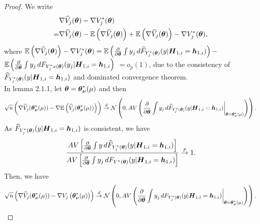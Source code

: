 \begin{proof}
	We write
	\begin{gather}
	\begin{flalign*}
	& \nabla \widehat{V}_j(\boldsymbol{\theta})  - \nabla V_j^*(\boldsymbol{\theta}) \\
	= & \nabla \widehat{V}_j(\boldsymbol{\theta})  - \mathbb{E}\left(\nabla \widehat{V}_j(\boldsymbol{\theta}) \right) + \mathbb{E}\left(\nabla \widehat{V}_j(\boldsymbol{\theta}) \right)- \nabla V_j^*(\boldsymbol{\theta}) ,
	\end{flalign*}
	\end{gather}
	where $ \mb{E}\lt(\nabla \wh{V}_j(\bs{\theta}) \rt)- \nabla V_j^*(\bs{\theta})=  \mb{E}\lt(\pard[\bs{\theta}]\int y_j \,d  \wh{F}_{Y_j^*(\bs{\theta})}(y | \bs{H}_{1,i} = \bs{h}_{1,i})\rt)  - $\\$\mb{E} \lt(\pard[\bs{\theta}]\int y_j \,d  F_{Y_j^*x(\bs{\theta})}(y_j| \bs{H}_{1,i} = \bs{h}_{1,i}\rt)$  $ = o_p(1)$, due to the consistency of $\widehat{F}_{Y_j^*(\boldsymbol{\theta})}(y | \boldsymbol{H}_{1,i} = \boldsymbol{h}_{1,i})$ and dominated convergence theorem.\\
	
	In lemma 2.1.1, let $\boldsymbol{\theta} = \boldsymbol{\theta}^*_{\boldsymbol{\nu}}(\mu)$ and then
	\begin{gather}
	\begin{flalign*}
	\sqrt{n}\lt(\nabla \wh{V}_j(\bs{\theta}^*_{\bs{\nu}}(\mu))  - \nabla \mb{E}\lt( \wh{V}_j(\bs{\theta}^*_{\bs{\nu}}(\mu))\rt)\rt)\overset{d}{\to}\mathcal{N}\lt(0,AV\lt(\pard[\bs{\theta}] \int y_j \,d \wh{F}_{Y_j^*(\bs{\theta})}(y | \bs{H}_{1,i} = \bs{h}_{1,i})\bigg\rvert_{\bs{\theta} = \bs{\theta}^*_{\bs{\nu}}(\mu)} \rt)\rt).
	\end{flalign*}
	\end{gather}
	As $\widehat{F}_{Y_j^*(\boldsymbol{\theta})}(y | \boldsymbol{H}_{1,i} = \boldsymbol{h}_{1,i})$ is consistent, we have
	\begin{gather*}
	\frac{AV\lt[\pard[\bs{\theta}] \int y \,d  \wh{F}_{Y_j^*(\bs{\theta})}(y | \bs{H}_{1,i} = \bs{h}_{1,i}) \rt]}{AV\lt[\pard[\bs{\theta}] \int y_j \,d  F_{Y^*(\bs{\theta})}(y | \bs{H}_{1,i} = \bs{h}_{1,i}) \rt]} \overset{p}{\to} 1.
	\end{gather*}
	Then, we have
	\begin{gather}
	\begin{flalign*}
	\sqrt{n}\lt(\nabla \wh{V}_j(\bs{\theta}^*_{\bs{\nu}}(\mu))  - \nabla V_j\lt(\bs{\theta}^*_{\bs{\nu}}(\mu)\rt)\rt)\overset{d}{\to}\mathcal{N}\lt(0,AV\lt(\pard[\bs{\theta}] \int y_j \,d F_{Y_j^*(\bs{\theta})}(y | \bs{H}_{1,i} = \bs{h}_{1,i})\bigg\rvert_{\bs{\theta} = \bs{\theta}^*_{\bs{\nu}}(\mu)} \rt)\rt).
	\end{flalign*}
	\end{gather}
\end{proof}

